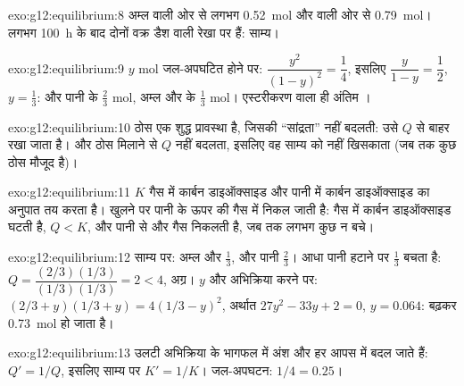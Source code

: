 \begin{solution}{exo:g12:equilibrium:8}
अम्ल वाली ओर से लगभग \qty{0.52}{mol} और  वाली ओर से
\qty{0.79}{mol}। लगभग \qty{100}{h} के बाद दोनों वक्र डैश वाली रेखा पर हैं:
साम्य।
\end{solution}

\begin{solution}{exo:g12:equilibrium:9}
$y$ mol जल-अपघटित होने पर: $\dfrac{y^2}{(1-y)^2} = \dfrac{1}{4}$, इसलिए
$\dfrac{y}{1-y} = \dfrac{1}{2}$, $y = \frac{1}{3}$:  और पानी के
$\frac{2}{3}$ mol, अम्ल और  के $\frac{1}{3}$ mol। एस्टरीकरण वाला ही
अंतिम ।
\end{solution}

\begin{solution}{exo:g12:equilibrium:10}
ठोस एक शुद्ध प्रावस्था है, जिसकी ``सांद्रता'' नहीं बदलती: उसे
$Q$ से बाहर रखा जाता है। और ठोस मिलाने से $Q$ नहीं बदलता, इसलिए वह
साम्य को नहीं खिसकाता (जब तक कुछ ठोस मौजूद है)।
\end{solution}

\begin{solution}{exo:g12:equilibrium:11}
$K$ गैस में कार्बन डाइऑक्साइड और पानी में कार्बन डाइऑक्साइड का अनुपात तय करता है।
खुलने पर पानी के ऊपर की गैस  में निकल जाती है: गैस में कार्बन डाइऑक्साइड
घटती है, $Q < K$, और पानी से और गैस निकलती है, जब तक लगभग
कुछ न बचे।
\end{solution}

\begin{solution}{exo:g12:equilibrium:12}
साम्य पर: अम्ल और  $\frac{1}{3}$,  और पानी
$\frac{2}{3}$। आधा पानी हटाने पर $\frac{1}{3}$ बचता है:
$Q = \dfrac{(2/3)(1/3)}{(1/3)(1/3)} = 2 < 4$, अग्र। $y$ और
अभिक्रिया करने पर: $(2/3 + y)(1/3 + y) = 4(1/3 - y)^2$, अर्थात
$27y^2 - 33y + 2 = 0$, $y = 0.064$:  बढ़कर \qty{0.73}{mol} हो जाता है।
\end{solution}

\begin{solution}{exo:g12:equilibrium:13}
उलटी अभिक्रिया के भागफल में अंश और हर
आपस में बदल जाते हैं: $Q' = 1/Q$, इसलिए साम्य पर $K' = 1/K$। जल-अपघटन:
$1/4 = 0.25$।
\end{solution}

